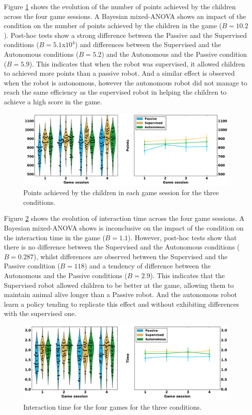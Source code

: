 Figure \ref{fig:points} shows the evolution of the number of points achieved by the children across the four game sessions. A Bayesian mixed-ANOVA shows an impact of the condition on the number of points achieved by the children in the game ($B=10.2$). Post-hoc tests show a strong difference between the Passive and the Supervised conditions ($B=5.1$x$10^4$) and differences between the Supervised and the Autonomous conditions ($B=5.2$) and the Autonomous and the Passive condition ($B=5.9$). This indicates that when the robot was supervised, it allowed children to achieved more points than a  passive robot. And a similar effect is observed when the robot is autonomous, however the autonomous robot did not manage to reach the same efficiency as the supervised robot in helping the children to achieve a high score in the game.

\begin{figure}[ht]
	\includegraphics[width=1\linewidth]{points.pdf}
	\centering
	\caption{Points achieved by the children in each game session for the three conditions.}
	\label{fig:points}
\end{figure}

Figure \ref{fig:time} shows the evolution of interaction time across the four game sessions. A Bayesian mixed-ANOVA shows is inconclusive on the impact of the condition on the interaction time in the game ($B=1.1$). However, post-hoc tests show that there is no difference between the Supervised and the Autonomous conditions ($B=0.287$), whilst differences are observed between the Supervised and the Passive condition ($B=118$) and a tendency of difference between the Autonomous and the Passive conditions ($B=2.9$). This indicates that the Supervised robot allowed children to be better at the game, allowing them to maintain animal alive longer than a Passive robot. And the autonomous robot learn a policy tending to replicate this effect and without exhibiting differences with the supervised one.

\begin{figure}[ht]
	\includegraphics[width=1\linewidth]{time.pdf}
	\centering
	\caption{Interaction time for the four games for the three conditions.}
	\label{fig:time}
\end{figure}

